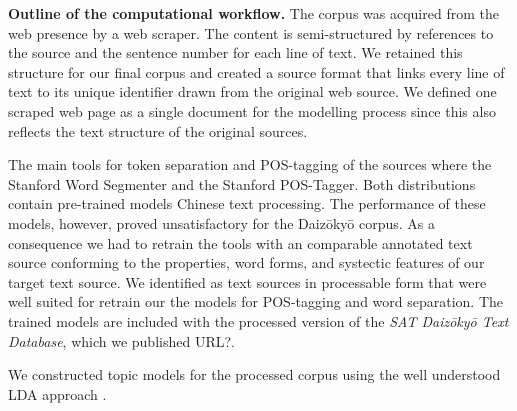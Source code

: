 \documentclass[a4paper,10pt]{article}
\newcommand{\TODO}[1]{\begingroup\color{red}#1\endgroup}
\begin{document}
  \textbf{Outline of the computational workflow.} The corpus was acquired
  from the web presence by a web scraper. The content is semi-structured by
  references to the source and the sentence number for each line of
  text. We retained this structure for our final corpus and created a
  source format that links every line of text to its unique identifier
  drawn from the original web source. We defined one scraped web page as a
  single document for the modelling process since this also reflects the
  text structure of the original sources.
    
  The main tools for token separation and POS-tagging of the sources where
  the Stanford Word Segmenter and the Stanford POS-Tagger. Both
  distributions contain pre-trained models Chinese text processing. The
  performance of these models, however, proved unsatisfactory for the
  Daiz{\=o}ky{\=o} corpus. As a consequence we had to retrain the tools
  with an comparable annotated text source conforming to the properties,
  word forms, and \TODO{systectic} features of our target text source.  We
  identified \cite{Lee:12,Wong:16} as text sources in processable form that
  were well suited for retrain our the models for POS-tagging and 
  word separation. The trained models are included with the
  processed version of the \textit{SAT Daiz{\=o}ky{\=o} Text Database},
  which we published \TODO{URL?}.  

  We constructed topic models for the processed corpus using the well
  understood LDA approach \cite{Blei03,GriffithStyvers05}.

\end{document}
